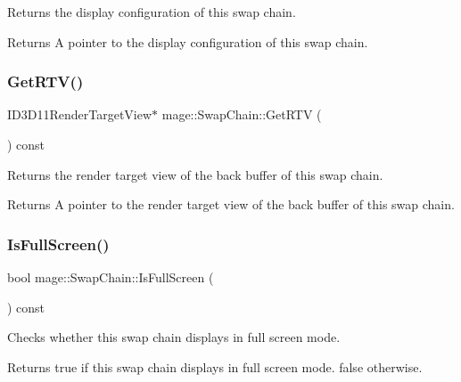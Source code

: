 Returns the display configuration of this swap chain.

\begin{DoxyReturn}{Returns}
A pointer to the display configuration of this swap chain. 
\end{DoxyReturn}
\hypertarget{classmage_1_1_swap_chain_a0b54dff5a39f10d9073bdbb1121a6144}{}\label{classmage_1_1_swap_chain_a0b54dff5a39f10d9073bdbb1121a6144} 
\subsubsection{\texorpdfstring{Get\+R\+T\+V()}{GetRTV()}}
{\footnotesize\ttfamily I\+D3\+D11\+Render\+Target\+View$\ast$ mage\+::\+Swap\+Chain\+::\+Get\+R\+TV (\begin{DoxyParamCaption}{ }\end{DoxyParamCaption}) const\hspace{0.3cm}{\ttfamily [noexcept]}}

Returns the render target view of the back buffer of this swap chain.

\begin{DoxyReturn}{Returns}
A pointer to the render target view of the back buffer of this swap chain. 
\end{DoxyReturn}
\hypertarget{classmage_1_1_swap_chain_a85873ca586fbcd83c237692a011d6d08}{}\label{classmage_1_1_swap_chain_a85873ca586fbcd83c237692a011d6d08} 
\subsubsection{\texorpdfstring{Is\+Full\+Screen()}{IsFullScreen()}}
{\footnotesize\ttfamily bool mage\+::\+Swap\+Chain\+::\+Is\+Full\+Screen (\begin{DoxyParamCaption}{ }\end{DoxyParamCaption}) const\hspace{0.3cm}{\ttfamily [noexcept]}}

Checks whether this swap chain displays in full screen mode.

\begin{DoxyReturn}{Returns}
{\ttfamily true} if this swap chain displays in full screen mode. {\ttfamily false} otherwise. 
\end{DoxyReturn}
\hypertarget{classmage_1_1_swap_chain_ad3b35e10612f7219cc4b6d61039e2f8c}{}\label{classmage_1_1_swap_chain_ad3b35e10612f7219cc4b6d61039e2f8c} 

